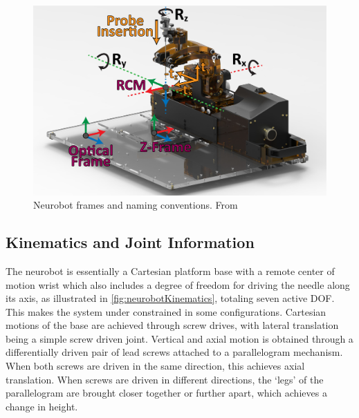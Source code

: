 \documentclass[12pt]{report}
\begin{document}
\begin{figure}[thpb]
	\centering
	\includegraphics[width=\textwidth]{images/neurobot_frames.jpg}
    \caption{Neurobot frames and naming conventions. From \cite{neurobotIros}}
    \label{fig:neurobotFrames}
\end{figure}

\subsection{Kinematics and Joint Information}
\label{sec:kinematicsJointInfo}
The neurobot is essentially a Cartesian platform base with a remote center of motion wrist which also includes a degree of freedom for driving the needle along its axis, as illustrated in \autoref{fig:neurobotKinematics}, totaling seven active DOF. This makes the system under constrained in some configurations. Cartesian motions of the base are achieved through screw drives, with lateral translation being a simple screw driven joint. Vertical and axial motion is obtained through a differentially driven pair of lead screws attached to a parallelogram mechanism. When both screws are driven in the same direction, this achieves axial translation. When screws are driven in different directions, the `legs' of the parallelogram are brought closer together or further apart, which achieves a change in height.
\end{document}
